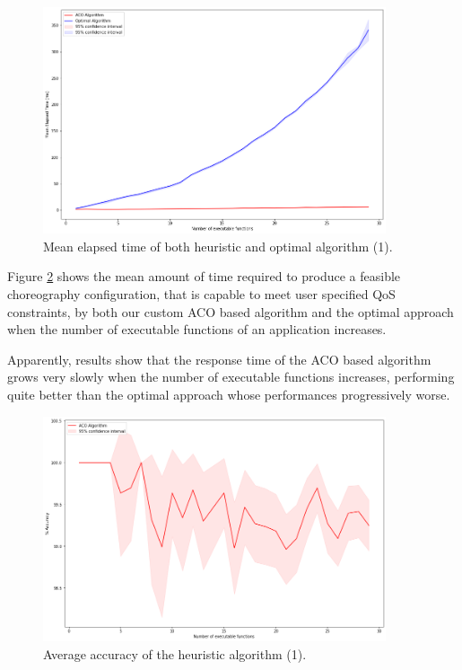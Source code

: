 \documentclass[12pt,a4paper]{report}
\begin{document}
\begin{figure}[h]
	\centering
	\includegraphics[width=0.9\textwidth]{./Images/ACOvsOptimalIncreasingExecutable.png}
	\caption{Mean elapsed time of both heuristic and optimal algorithm (1).}%
	\label{ACOvsOptimalIncreasingExecutable}
\end{figure}

Figure \ref{ACOvsOptimalIncreasingExecutable} shows the mean amount of time required to produce a feasible choreography configuration, that is capable to meet user specified QoS constraints, by both our custom ACO based algorithm and the optimal approach when the number of executable functions of an application increases. 

Apparently, results show that the response time of the ACO based algorithm grows very slowly when the number of executable functions increases, performing quite better than the optimal approach whose performances progressively worse.

\begin{figure}[h]
	\centering
	\includegraphics[width=0.9\textwidth]{./Images/ACOvsOptimalAccuracyIncreasingExecutable.png}
	\caption{Average accuracy of the heuristic algorithm (1).}%
	\label{ACOvsOptimalIncreasingExecutable}
\end{figure}
\end{document}
